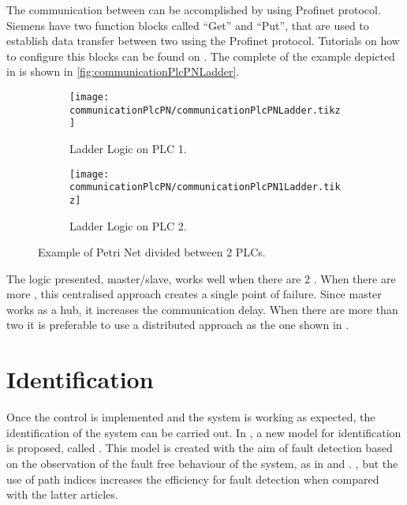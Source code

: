 The communication between \PLCs{} can be accomplished by using Profinet
protocol. Siemens \PLCs{} have two function blocks called ``Get'' and
``Put'', that are used to establish data transfer between two \PLCs{} using the
Profinet protocol. Tutorials on how to configure this blocks can be found on \citep{antunesfloriano2019sincronizacao,oliveira2016protocolo,rochapereira2019automacao}.
The complete \LD{} of the example depicted in  is shown in \autoref{fig:communicationPlcPNLadder}.

\begin{figure}[H]
  \centering
  \begin{subfigure}[t]{0.45\textwidth}
    \centering
    \texttt{[image: communicationPlcPN/communicationPlcPNLadder.tikz]}
    \caption{Ladder Logic on PLC 1.}
    \label{fig:communicationPlcPN1Ladder}
  \end{subfigure}%
  \hfill
  \begin{subfigure}[t]{0.45\textwidth}
    \centering
    \texttt{[image: communicationPlcPN/communicationPlcPN1Ladder.tikz]}
    \caption{Ladder Logic on PLC 2.}
    \label{fig:communicationPlcPN2Ladder}
  \end{subfigure}
  \caption{Example of Petri Net divided between 2 PLCs.}
  \label{fig:communicationPlcPNLadder}
\end{figure}



The logic presented, master\slash slave, works well when
there are 2 \PLCs. When there are more \PLCs, this centralised approach
creates a single point of failure. Since master \PLC{} works as a hub, it
increases the communication delay. When there are more than two \PLCs{} it is
preferable to use a distributed approach as the one shown in
\cite{antunesfloriano2019sincronizacao}.

\section{Identification}
\label{sec:identification}

Once the control is implemented and the system is working as expected, the
identification of the system can be carried out.
In \cite{moreira2018enhanced}, a new model for \DES{} identification is proposed, called
\DAOCT. This model is created with the aim of fault detection based
on the observation of the fault free behaviour of the system, as in \cite{roth2009fdi} and \cite{klein2005fault}.
, but the use of path indices increases the
efficiency for fault detection when compared with the latter articles.

